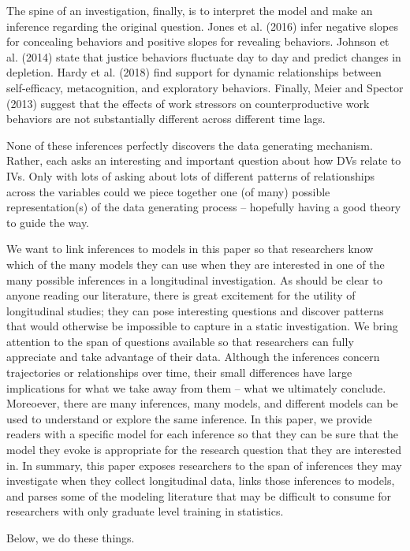 \documentclass[english,,man]{apa6}
\theoremstyle{definition}
\theoremstyle{definition}
\theoremstyle{definition}
\theoremstyle{remark}
\begin{document}
The spine of an investigation, finally, is to interpret the model and
make an inference regarding the original question. Jones et al. (2016)
infer negative slopes for concealing behaviors and positive slopes for
revealing behaviors. Johnson et al. (2014) state that justice behaviors
fluctuate day to day and predict changes in depletion. Hardy et al.
(2018) find support for dynamic relationships between self-efficacy,
metacognition, and exploratory behaviors. Finally, Meier and Spector
(2013) suggest that the effects of work stressors on counterproductive
work behaviors are not substantially different across different time
lags.

None of these inferences perfectly discovers the data generating
mechanism. Rather, each asks an interesting and important question about
how DVs relate to IVs. Only with lots of asking about lots of different
patterns of relationships across the variables could we piece together
one (of many) possible representation(s) of the data generating process
-- hopefully having a good theory to guide the way.

We want to link inferences to models in this paper so that researchers
know which of the many models they can use when they are interested in
one of the many possible inferences in a longitudinal investigation. As
should be clear to anyone reading our literature, there is great
excitement for the utility of longitudinal studies; they can pose
interesting questions and discover patterns that would otherwise be
impossible to capture in a static investigation. We bring attention to
the span of questions available so that researchers can fully appreciate
and take advantage of their data. Although the inferences concern
trajectories or relationships over time, their small differences have
large implications for what we take away from them -- what we ultimately
conclude. Moreoever, there are many inferences, many models, and
different models can be used to understand or explore the same
inference. In this paper, we provide readers with a specific model for
each inference so that they can be sure that the model they evoke is
appropriate for the research question that they are interested in. In
summary, this paper exposes researchers to the span of inferences they
may investigate when they collect longitudinal data, links those
inferences to models, and parses some of the modeling literature that
may be difficult to consume for researchers with only graduate level
training in statistics.

Below, we do these things.
\end{document}
